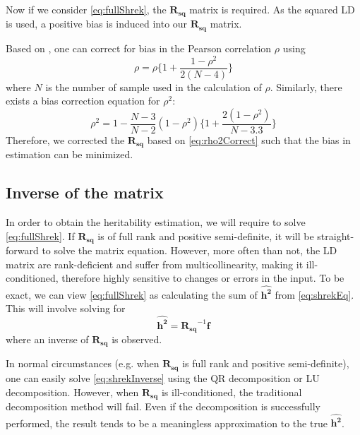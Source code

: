 			Now if we consider \cref{eq:fullShrek}, the $\boldsymbol{R_{sq}}$ matrix is required.
			As the squared \gls{LD} is used, a positive bias is induced into our $\boldsymbol{R_{sq}}$ matrix. 
			
			Based on \citet{Shieh2010}, one can correct for bias in the Pearson correlation $\rho$ using
			\begin{equation}
			\rho = \rho\{1+\frac{1-\rho^2}{2(N-4)}\}
			\label{eq:rhoCorrect}
			\end{equation}
			where $N$ is the number of sample used in the calculation of $\rho$. 
			Similarly, there exists a bias correction equation for $\rho^2$:
			\begin{equation}
				\rho^2=1-\frac{N-3}{N-2}(1-\rho^2)\{1+\frac{2(1-\rho^2)}{N-3.3}\}
				\label{eq:rho2Correct}
			\end{equation}
			Therefore, we corrected the $\boldsymbol{R_{sq}}$ based on \cref{eq:rho2Correct} such that the bias in estimation can be minimized. 
		\subsection{Inverse of the  matrix}
			In order to obtain the heritability estimation, we will require to solve \cref{eq:fullShrek}. 
			If $\boldsymbol{R_{sq}}$ is of full rank and positive semi-definite, it will be straight-forward to solve the matrix equation.
			However, more often than not, the \gls{LD} matrix are rank-deficient and suffer from multicollinearity, making it ill-conditioned, therefore highly sensitive to changes or errors in the input.
			To be exact, we can view \cref{eq:fullShrek} as calculating the sum of $\boldsymbol{\hat{h^2}}$ from  \cref{eq:shrekEq}.
			This will involve solving for
			\begin{equation}
			\boldsymbol{\hat{h^2}} = \boldsymbol{R_{sq}}^{-1}\boldsymbol{f}
			\label{eq:shrekInverse}
			\end{equation}
			where an inverse of $\boldsymbol{R_{sq}}$ is observed. 
			
			In normal circumstances (e.g. when $\boldsymbol{R_{sq}}$ is full rank and positive semi-definite), one can easily solve \cref{eq:shrekInverse} using the QR decomposition or LU decomposition.
			However, when $\boldsymbol{R_{sq}}$ is ill-conditioned, the traditional decomposition method will fail.
			Even if the decomposition is successfully performed, the result tends to be a meaningless approximation to the true $\boldsymbol{\hat{h^2}}$. 
			
